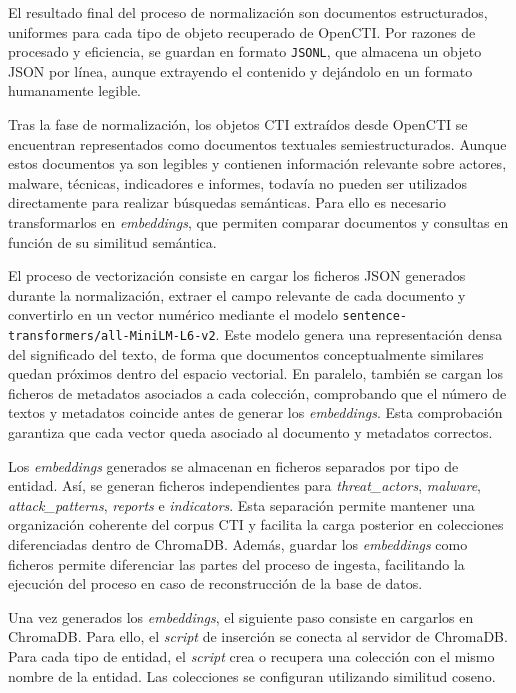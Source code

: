 \documentclass[12pt]{report}
\begin{document}
El resultado final del proceso de normalización son documentos estructurados, uniformes para cada tipo de objeto recuperado de OpenCTI. Por razones de procesado y eficiencia, se guardan en formato \texttt{JSONL}, que almacena un objeto JSON por línea, aunque extrayendo el contenido y dejándolo en un formato humanamente legible.


Tras la fase de normalización, los objetos CTI extraídos desde OpenCTI se encuentran representados como documentos textuales semiestructurados. Aunque estos documentos ya son legibles y contienen información relevante sobre actores, malware, técnicas, indicadores e informes, todavía no pueden ser utilizados directamente para realizar búsquedas semánticas. Para ello es necesario transformarlos en \textit{embeddings}, que permiten comparar documentos y consultas en función de su similitud semántica.

El proceso de vectorización consiste en cargar los ficheros JSON generados durante la normalización, extraer el campo relevante de cada documento y convertirlo en un vector numérico mediante el modelo \texttt{sentence-transformers/all-MiniLM-L6-v2}. Este modelo genera una representación densa del significado del texto, de forma que documentos conceptualmente similares quedan próximos dentro del espacio vectorial. En paralelo, también se cargan los ficheros de metadatos asociados a cada colección, comprobando que el número de textos y metadatos coincide antes de generar los \textit{embeddings}. Esta comprobación garantiza que cada vector queda asociado al documento y metadatos correctos.

Los \textit{embeddings} generados se almacenan en ficheros separados por tipo de entidad. Así, se generan ficheros independientes para \textit{threat\_actors}, \textit{malware}, \textit{attack\_patterns}, \textit{reports} e \textit{indicators}. Esta separación permite mantener una organización coherente del corpus CTI y facilita la carga posterior en colecciones diferenciadas dentro de ChromaDB. Además, guardar los \textit{embeddings} como ficheros permite diferenciar las partes del proceso de ingesta, facilitando la ejecución del proceso en caso de reconstrucción de la base de datos.

Una vez generados los \textit{embeddings}, el siguiente paso consiste en cargarlos en ChromaDB. Para ello, el \textit{script} de inserción se conecta al servidor de ChromaDB. Para cada tipo de entidad, el \textit{script} crea o recupera una colección con el mismo nombre de la entidad. Las colecciones se configuran utilizando similitud coseno.
\end{document}
